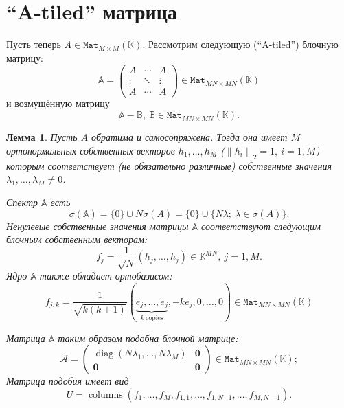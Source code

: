 \documentclass[14pt,a4paper]{extarticle}
\numberwithin{equation}{section}
\newtheorem{lem}{Лемма}
\theoremstyle{definition}
\begin{document}
\newpage
\section{``A-tiled'' матрица}

Пусть теперь \( A\in\mathtt{Mat}_{M{\times}M}(\mathbb{K}) \).
Рассмотрим следующую (``A-tiled'') блочную матрицу:
    \[
        \mathbb{A} =
        \begin{pmatrix}
            A & \cdots & A \\
            \vdots & \ddots & \vdots \\
            A & \cdots & A
        \end{pmatrix}
        \in\mathtt{Mat}_{{MN}{\times}{MN}}(\mathbb{K})
    \]
    и возмущённую матрицу
    \[
        \mathbb{A} - \mathbb{B},\ \mathbb{B}\in\mathtt{Mat}_{{MN}{\times}{MN}}(\mathbb{K}).
    \]

\begin{lem}
    Пусть \( A \) обратима и самосопряжена.
    Тогда она имеет \( M \) ортонормальных собственных векторов \( h_1, \ldots, h_M \)
    (\(\left\|h_i\right\|_2 = 1,\ i{=}\overline{1,M}\))
    которым соответствует (не обязательно различные) собственные значения
    \( \lambda_1, \ldots, \lambda_M \neq 0\).

    Спектр \( \mathbb{A} \) есть
    \[
        \sigma(\mathbb{A}) = \{0\}\cup N\sigma(A) = \{0\} \cup \{N\lambda;\ \lambda\in\sigma(A) \}.
    \]
    Ненулевые собственные значения матрицы \( \mathbb{A} \)
    соответствуют следующим блочным собственным векторам:
    \[
        f_j = \frac{1}{\sqrt{N}} (h_j, \ldots, h_j)\in \mathbb{K}^{MN},\ j=\overline{1,M}.
    \]
    Ядро \( \mathbb{A} \)
    также обладает ортобазисом:
    \[
        f_{j,k} = \frac{1}{\sqrt{k(k+1)}}
        (
        \underbrace{e_j, \ldots, e_j}_{k\ \text{copies}},
        -ke_j,
        0, \ldots, 0
        ) \in\mathtt{Mat}_{{MN}{\times}{MN}}(\mathbb{K})
    \]

    Матрица \( \mathbb{A} \) таким образом подобна блочной матрице:
    \[
        \mathcal{A} =
        \left(\begin{array}{c|c}
            \operatorname{diag}(N\lambda_1,\ldots,N\lambda_M) & \mathbf{0} \\ \hline
            \mathbf{0} & \mathbf{0}
        \end{array}\right)\in\mathtt{Mat}_{{MN}{\times}{MN}}(\mathbb{K});
    \]
    Матрица подобия имеет вид
    \[
        U = \operatorname{columns}
        \left(f_1, \ldots, f_M, f_{1,1}, \ldots, f_{1,N{-1}}, \ldots, f_{M,N{-}1}\right).
    \]
\end{lem}
\end{document}
